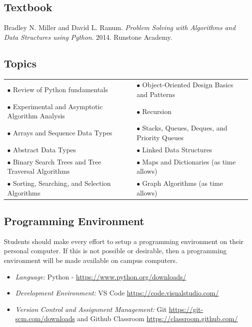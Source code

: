 \documentclass[10pt]{article}
\begin{document}
\subsection{Textbook}
\label{sec:orgc3d87e3}

\noindent
Bradley N. Miller and David L. Ranum. \textit{Problem Solving with Algorithms and Data Structures using Python}. 2014. Runstone Academy. 


\subsection{Topics}
\label{sec:org302b48c}

\begin{center}
\begin{tabular}{ll}
\(\bullet\) Review of Python fundamentals & \(\bullet\) Object-Oriented Design Basics and Patterns\\
\(\bullet\) Experimental and Asymptotic Algorithm Analysis & \(\bullet\) Recursion\\
\(\bullet\) Arrays and Sequence Data Types & \(\bullet\) Stacks, Queues, Deques, and Priority Queues\\
\(\bullet\) Abstract Data Types & \(\bullet\) Linked Data Structures\\
\(\bullet\) Binary Search Trees and Tree Traversal Algorithms & \(\bullet\) Maps and Dictionaries (as time allows)\\
\(\bullet\) Sorting, Searching, and Selection Algorithms & \(\bullet\) Graph Algorithms (as time allows)\\
\end{tabular}
\end{center}

\subsection{Programming Environment}
\label{sec:org16c7836}
Students should make every effort to setup a programming environment on their personal computer.  If this is not possible
or desirable, then a programming environment will be made available on campus computers. 

\begin{itemize}
\item \textit{Language:} Python - \url{https://www.python.org/downloads/} 
\item \textit{Development Environment:} VS Code \url{https://code.visualstudio.com/}
\item \textit{Version Control and Assignment Management:} Git \url{https://git-scm.com/downloads} and Github Classroom \url{https://classroom.github.com/}
\end{itemize}
\end{document}
